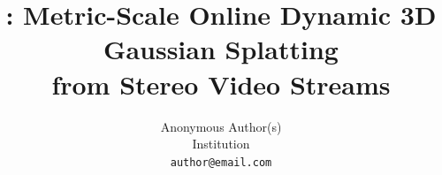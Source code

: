 \documentclass[10pt,twocolumn,letterpaper]{article}
\title{\StereoSplat: Metric-Scale Online Dynamic 3D Gaussian Splatting\\
from Stereo Video Streams}
\author{Anonymous Author(s)\\
Institution\\
{\tt\small author@email.com}
}
\begin{document}
\maketitle







{
    \small
    
    
}
\end{document}

